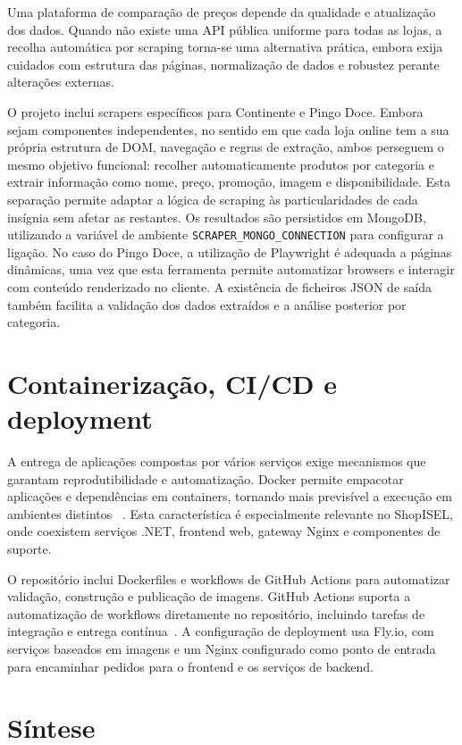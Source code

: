 Uma plataforma de comparação de preços depende da qualidade e atualização dos dados.
Quando não existe uma \ac{API} pública uniforme para todas as lojas, a recolha
automática por scraping torna-se uma alternativa prática, embora exija cuidados com
estrutura das páginas, normalização de dados e robustez perante alterações externas.

O projeto inclui scrapers específicos para Continente e Pingo Doce. Embora sejam
componentes independentes, no sentido em que cada loja online tem a sua própria
estrutura de DOM, navegação e regras de extração, ambos perseguem o mesmo
objetivo funcional: recolher automaticamente produtos por categoria e extrair
informação como nome, preço, promoção, imagem e disponibilidade. Esta separação
permite adaptar a lógica de scraping às particularidades de cada insígnia sem afetar
as restantes. Os resultados são persistidos em MongoDB, utilizando a variável de ambiente \texttt{SCRAPER\_MONGO\_CONNECTION} para configurar a ligação. No caso do Pingo Doce, a
utilização de Playwright é adequada a páginas dinâmicas, uma vez que esta ferramenta
permite automatizar browsers e interagir com conteúdo renderizado no cliente. A
existência de ficheiros \ac{JSON} de saída também facilita a validação dos dados
extraídos e a análise posterior por categoria.

\section{Containerização, CI/CD e deployment}
\label{sec:2.8}

A entrega de aplicações compostas por vários serviços exige mecanismos que garantam
reprodutibilidade e automatização. Docker permite empacotar aplicações e dependências
em containers, tornando mais previsível a execução em ambientes distintos
~\cite{docker-overview}. Esta característica é especialmente relevante no ShopISEL,
onde coexistem serviços .NET, frontend web, gateway Nginx e componentes de suporte.

O repositório inclui Dockerfiles e workflows de GitHub Actions para automatizar
validação, construção e publicação de imagens. GitHub Actions suporta a automatização
de workflows diretamente no repositório, incluindo tarefas de integração e entrega
contínua~\cite{github-actions}. A configuração de deployment usa Fly.io, com serviços
baseados em imagens e um Nginx configurado como ponto de entrada para encaminhar
pedidos para o frontend e os serviços de backend.

\section{Síntese}
\label{sec:2.9}

